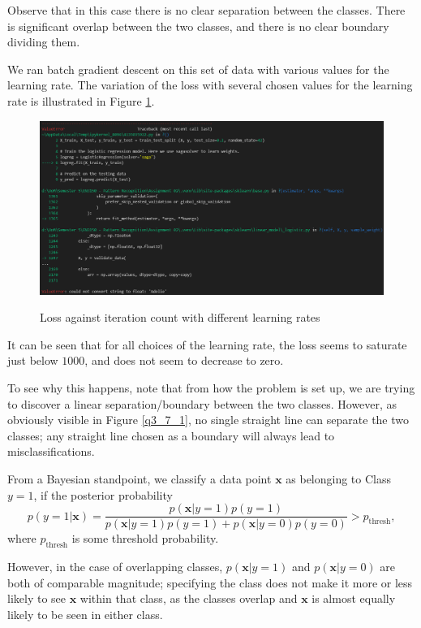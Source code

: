\documentclass{article}[a4paper]
\begin{document}
	Observe that in this case there is no clear separation between the classes. There is significant overlap between the two classes, and there is no clear boundary dividing them.

	We ran batch gradient descent on this set of data with various values for the learning rate. The variation of the loss with several chosen values for the learning rate is illustrated in Figure \ref{q3_7_2}.

	\begin{figure}[H]
		\centering
		\includegraphics[width=0.8\linewidth]{images/error.png}
		\label{q3_7_2}
		\caption{Loss against iteration count with different learning rates}
	\end{figure}

	It can be seen that for all choices of the learning rate, the loss seems to saturate just below $1000$, and does not seem to decrease to zero.

	To see why this happens, note that from how the problem is set up, we are trying to discover a linear separation/boundary between the two classes. However, as obviously visible in Figure \ref{q3_7_1}, no single straight line can separate the two classes; any straight line chosen as a boundary will always lead to misclassifications.

	From a Bayesian standpoint, we classify a data point $\mathbf{x}$ as belonging to Class $y=1$, if the posterior probability \[
		p \left( y = 1 \vert \mathbf{x} \right)
		=
		\dfrac{
			p \left( \mathbf{x} \vert y = 1 \right) p \left( y = 1 \right)
		}{
			p \left( \mathbf{x} \vert y = 1 \right) p \left( y = 1 \right)
			+
			p \left( \mathbf{x} \vert y = 0 \right) p \left( y = 0 \right)
		}
		> p_\text{thresh},
	\]
	where $p_\text{thresh}$ is some threshold probability.

	However, in the case of overlapping classes, $p \left( \mathbf{x} \vert y = 1 \right)$ and $p \left( \mathbf{x} \vert y = 0 \right)$ are both of comparable magnitude; specifying the class does not make it more or less likely to see $\mathbf{x}$ within that class, as the classes overlap and $\mathbf{x}$ is almost equally likely to be seen in either class.
\end{document}
